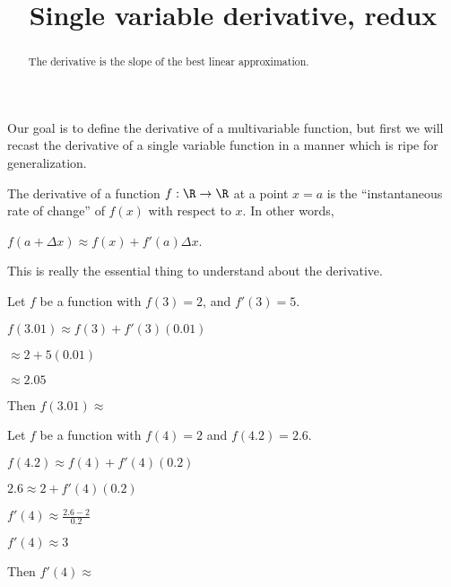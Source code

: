 \documentclass{ximera}
\title{Single variable derivative, redux}
\begin{document}
\begin{abstract}
The derivative is the slope of the best linear approximation.
\end{abstract}
	
Our goal is to define the derivative of a multivariable function, but first we will recast the derivative of a single variable function in a
manner which is ripe for generalization.
	
The derivative of a function $f:\R \to \R$ at a point $x = a$ is the ``instantaneous rate of change'' of $f(x)$ with respect to $x$.
In other words, 
	
$f(a + \Delta x) \approx f(x) +f'(a)\Delta x$.
	
This is really the essential thing to understand about the derivative.
	
\begin{question}
  Let $f$ be a function with $f(3)  = 2$, and $f'(3) = 5$.
  \begin{solution}
    \begin{hint}
      $f(3.01) \approx f(3)+f'(3)(0.01)$
    \end{hint}
    \begin{hint}
      $\approx 2+5(0.01)$
    \end{hint}
    \begin{hint}
      $\approx 2.05$
    \end{hint}
    Then $f(3.01) \approx $ 
  \end{solution}
\end{question}
	
\begin{question}
  Let $f$ be a function with $f(4)=2$ and $f(4.2) = 2.6$.  
  
  \begin{solution}
    \begin{hint}
      $f(4.2) \approx f(4)+f'(4)(0.2)$
    \end{hint}
    \begin{hint}
      $2.6 \approx 2+f'(4)(0.2)$
    \end{hint}
    \begin{hint}
      $f'(4) \approx \frac{2.6 - 2}{0.2}$
    \end{hint}
    \begin{hint}
      $f'(4) \approx 3$
    \end{hint}
    Then $f'(4) \approx$ 
  \end{solution}
\end{question}
\end{document}
